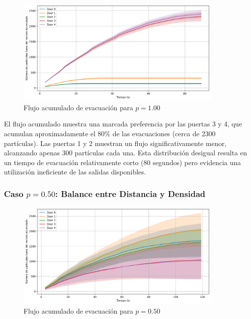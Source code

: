 \documentclass[12pt]{article}
\begin{document}
\begin{figure}[H]
    \centering
    \includegraphics[width=0.9\textwidth]{img/cumulative_door_flows_t_20_&_p_1.00.png}
    \caption{Flujo acumulado de evacuación para $p=1.00$}
    \label{fig:flow_p100}
\end{figure}

El flujo acumulado muestra una marcada preferencia por las puertas 3 y 4, que acumulan aproximadamente el 80\% de las evacuaciones (cerca de 2300 partículas). Las puertas 1 y 2 muestran un flujo significativamente menor, alcanzando apenas 300 partículas cada una. Esta distribución desigual resulta en un tiempo de evacuación relativamente corto (80 segundos) pero evidencia una utilización ineficiente de las salidas disponibles.

\subsubsection{Caso $p=0.50$: Balance entre Distancia y Densidad}

\begin{figure}[H]
    \centering
    \includegraphics[width=0.9\textwidth]{img/cumulative_door_flows_t_20_&_p_0.50.png}
    \caption{Flujo acumulado de evacuación para $p=0.50$}
    \label{fig:flow_p050}
\end{figure}
\end{document}
